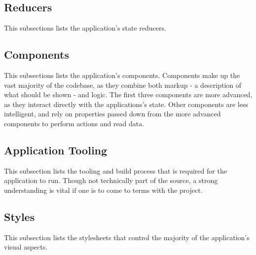 \subsection{Reducers} %
\label{sub:reducers}
This subsections lists the application's state reducers.


\subsection{Components} %
\label{sub:reducers}
This subsections lists the application's components. Components make up the vast majority of the codebase, as they combine both markup - a description of what should be shown - and logic. The first three components are more advanced, as they interact directly with the applications's state. Other components are less intelligent, and rely on properties passed down from the more advanced components to perform actions and read data.


\subsection{Application Tooling} %
\label{sub:api_models}
This subsection lists the tooling and build process that is required for the application to run. Though not technically part of the source, a strong understanding is vital if one is to come to terms with the project.


\subsection{Styles} %
\label{sub:styles}
This subsection lists the stylesheets that control the majority of the application's visual aspects.

